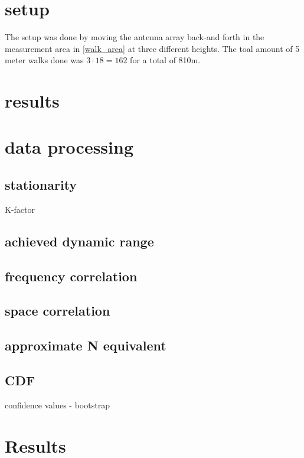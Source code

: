 \section{setup}
The setup was done by moving the antenna array back-and forth in the measurement area in \autoref{walk_area} at three different heights. The toal amount of 5 meter walks done was $3 \cdot 18 = 162$ for a total of 810m.
\section{results}
\section{data processing}
\subsection{stationarity}
K-factor
\subsection{achieved dynamic range}
\subsection{frequency correlation}
\subsection{space correlation}
\subsection{approximate N equivalent}
\subsection{CDF}
confidence values - bootstrap

\section{Results}